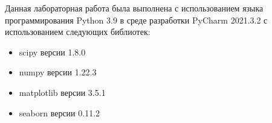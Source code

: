 Данная лабораторная работа была выполнена с использованием языка
программирования Python 3.9 в среде разработки PyCharm 2021.3.2 с
использованием следующих библиотек:
\begin{itemize}
\item scipy версии 1.8.0
\item numpy версии 1.22.3
\item matplotlib версии 3.5.1
\item seaborn версии 0.11.2
\end{itemize}
